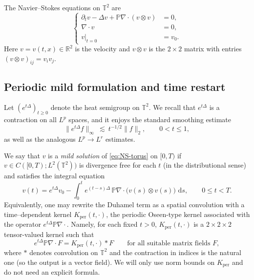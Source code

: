 \documentclass[12pt]{article}
\newcommand{\R}{\mathbb{R}}
\newcommand{\T}{\mathbb{T}}
\newcommand{\dd}{\,\mathrm{d}}
\theoremstyle{remark}
\theoremstyle{remark}
\begin{document}
The Navier--Stokes equations on $\T^2$ are
\begin{equation}\label{eq:NS-torus}
\left\{
\begin{aligned}
\partial_t v - \Delta v + \mathbb P\nabla\cdot (v\otimes v) &= 0,\\
\nabla\cdot v &= 0,\\
v|_{t=0} &= v_0.
\end{aligned}
\right.
\end{equation}
Here $v=v(t,x)\in\R^2$ is the velocity and $v\otimes v$ is the $2\times 2$ matrix with entries
$(v\otimes v)_{ij}=v_i v_j$.

\subsection{Periodic mild formulation and time restart}

Let $(e^{t\Delta})_{t\ge 0}$ denote the heat semigroup on $\T^2$. We recall that
$e^{t\Delta}$ is a contraction on all $L^p$ spaces, and it enjoys the standard smoothing estimate
\begin{equation}\label{eq:heat-L2-Linfty}
\|e^{t\Delta}f\|_{\infty}\ \lesssim\ t^{-1/2}\|f\|_{2},\qquad 0<t\le 1,
\end{equation}
as well as the analogous $L^p\to L^r$ estimates.

We say that $v$ is a \emph{mild solution} of \eqref{eq:NS-torus} on $[0,T)$ if $v\in C([0,T);L^2(\T^2))$
is divergence free for each $t$ (in the distributional sense) and satisfies the integral equation
\begin{equation}\label{eq:mild-0}
v(t)=e^{t\Delta}v_0 - \int_0^t e^{(t-s)\Delta}\,\mathbb P\nabla\cdot\bigl(v(s)\otimes v(s)\bigr)\,\dd s,
\qquad 0\le t<T.
\end{equation}
Equivalently, one may rewrite the Duhamel term as a spatial convolution with a time--dependent kernel
$K_{\mathrm{per}}(t,\cdot)$, the periodic Oseen-type kernel associated with the operator
$e^{t\Delta}\mathbb P\nabla\cdot$. Namely, for each fixed $t>0$, $K_{\mathrm{per}}(t,\cdot)$ is a
$2\times 2\times 2$ tensor-valued kernel such that
\begin{equation}\label{eq:kernel-form}
e^{t\Delta}\mathbb P\nabla\cdot F = K_{\mathrm{per}}(t,\cdot) * F
\qquad \text{for all suitable matrix fields }F,
\end{equation}
where $*$ denotes convolution on $\T^2$ and the contraction in indices is the natural one
(so the output is a vector field).
We will only use norm bounds on $K_{\mathrm{per}}$ and do not need an explicit formula.
\end{document}
